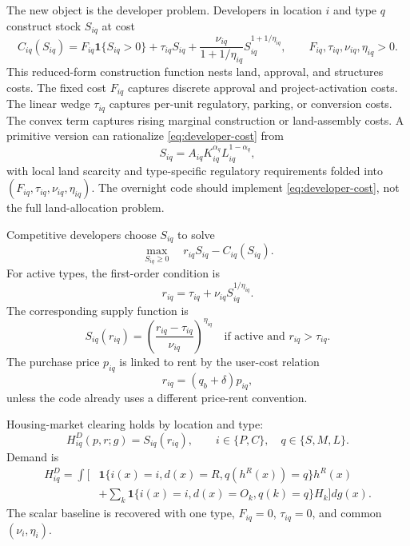 \documentclass[11pt]{article}
\newcommand{\ind}{\mathbf 1}
\begin{document}
The new object is the developer problem. Developers in location $i$ and type $q$ construct stock $S_{iq}$ at cost
\begin{equation}
    C_{iq}(S_{iq})
    =
    F_{iq}\ind\{S_{iq}>0\}
    +\tau_{iq}S_{iq}
    +\frac{\nu_{iq}}{1+1/\eta_{iq}}S_{iq}^{1+1/\eta_{iq}},
    \qquad
    F_{iq},\tau_{iq},\nu_{iq},\eta_{iq}>0.
    \label{eq:developer-cost}
\end{equation}
This reduced-form construction function nests land, approval, and structures costs. The fixed cost $F_{iq}$ captures discrete approval and project-activation costs. The linear wedge $\tau_{iq}$ captures per-unit regulatory, parking, or conversion costs. The convex term captures rising marginal construction or land-assembly costs. A primitive version can rationalize \eqref{eq:developer-cost} from
\begin{equation}
    S_{iq}=A_{iq}K_{iq}^{\alpha_q}L_{iq}^{1-\alpha_q},
    \label{eq:primitive-construction}
\end{equation}
with local land scarcity and type-specific regulatory requirements folded into $(F_{iq},\tau_{iq},\nu_{iq},\eta_{iq})$. The overnight code should implement \eqref{eq:developer-cost}, not the full land-allocation problem.

Competitive developers choose $S_{iq}$ to solve
\begin{equation}
    \max_{S_{iq}\geq0}\quad r_{iq}S_{iq}-C_{iq}(S_{iq}).
    \label{eq:developer-profit}
\end{equation}
For active types, the first-order condition is
\begin{equation}
    r_{iq}=\tau_{iq}+\nu_{iq}S_{iq}^{1/\eta_{iq}}.
    \label{eq:developer-foc}
\end{equation}
The corresponding supply function is
\begin{equation}
    S_{iq}(r_{iq})=
    \left(\frac{r_{iq}-\tau_{iq}}{\nu_{iq}}\right)^{\eta_{iq}}
    \quad\text{if active and } r_{iq}>\tau_{iq}.
    \label{eq:developer-supply}
\end{equation}
The purchase price $p_{iq}$ is linked to rent by the user-cost relation
\begin{equation}
    r_{iq}=(q_b+\delta)p_{iq},
    \label{eq:user-cost-developer}
\end{equation}
unless the code already uses a different price-rent convention.

Housing-market clearing holds by location and type:
\begin{equation}
    H^D_{iq}(p,r;g)=S_{iq}(r_{iq}),
    \qquad i\in\{P,C\},\quad q\in\{S,M,L\}.
    \label{eq:type-clearing}
\end{equation}
Demand is
\begin{equation}
\begin{aligned}
H^D_{iq}
=
\int
\Big[
&\ind\{i(x)=i,d(x)=R,q(h^R(x))=q\}h^R(x)\\
&+
\sum_k \ind\{i(x)=i,d(x)=O_k,q(k)=q\}H_k
\Big]dg(x).
\end{aligned}
\label{eq:type-demand}
\end{equation}
The scalar baseline is recovered with one type, $F_{iq}=0$, $\tau_{iq}=0$, and common $(\nu_i,\eta_i)$.
\end{document}
